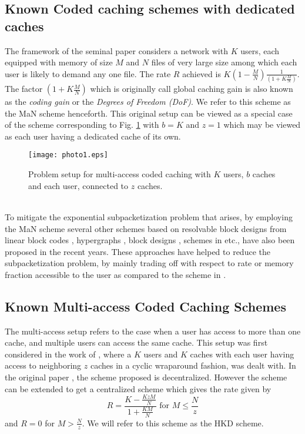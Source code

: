 \documentclass[conference]{IEEEtran}
\begin{document}
	\subsection{Known Coded caching schemes with dedicated caches}
	\label{sec1B}
	The framework of the seminal paper \cite{MaN} considers a network with $K$ users, each equipped with memory of size ${M}$ and $N$ files of very large size among which each user is likely to demand any one file. The rate $R$ achieved is 
	$ K  \left(1 - \frac{{M}}{N}\right) \frac{1}{(1 + K\frac{{M}}{N})}.$ The factor $(1 + K\frac{{M}}{N})$ which is originally call global caching gain is also known as the {\it coding gain} or the {\it Degrees of Freedom (DoF)}. We refer to this scheme as the MaN scheme henceforth. This original setup can be viewed as a special case of the scheme corresponding to Fig. \ref{fig1} with $b=K$ and $z=1$ which may be viewed as each user having a dedicated cache of its own. 	
	\begin{figure}
		\begin{center}
			\texttt{[image: photo1.eps]}
			\caption {Problem setup for multi-access coded caching with $K$ users, $b$ caches and each user, connected to $z$ caches.}
			\label{fig1}
		\end{center}
	\end{figure}
	\\
	To mitigate the exponential subpacketization problem that arises, by employing the MaN scheme several other schemes based on resolvable block designs from linear block codes \cite{TaR}, hypergraphs \cite{SZG}, block designs \cite{KrP1}, schemes in \cite{CJYT} etc., have also been proposed in the recent years. These approaches have helped to reduce the subpacketization problem, by mainly trading off with respect to rate or memory fraction accessible to the user as compared to the scheme in \cite{MaN}.
	\subsection{Known Multi-access Coded Caching Schemes}
    \label{sec1C}
	The multi-access setup refers to the case when a user has access to more than one cache, and multiple users can access the same cache. This setup was first considered in the work of \cite{HKD}, 
	where a $K$ users and $K$ caches with each user having access to neighboring $z$ caches in a cyclic wraparound fashion, was dealt with. In the original paper \cite{HKD}, the scheme proposed is decentralized. However the scheme can be extended to get a centralized scheme which gives the rate given by
	$$R = \frac{K - \frac{KzM}{N}}{1 + \frac{KM}{N}} \text{ for }  M \leq \frac{N}{z}$$
	and $R = 0$ for $M > \frac{N}{z}$.
	We will refer to this scheme as the HKD scheme.
	 
\end{document}
